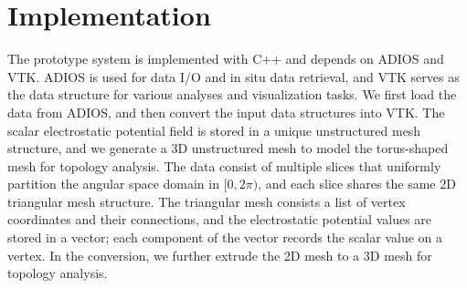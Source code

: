 \section{Implementation}

The prototype system is implemented with C++ and depends on ADIOS and VTK.  ADIOS is used for data I/O and in situ data retrieval, and VTK serves as the data structure for various analyses and visualization tasks.  We first load the data from ADIOS, and then convert the input data structures into VTK.  The scalar electrostatic potential field is stored in a unique unstructured mesh structure, and we generate a 3D unstructured mesh to model the torus-shaped mesh for topology analysis.  The data consist of multiple slices that uniformly partition the angular space domain in $[0, 2\pi)$, and each slice shares the same 2D triangular mesh structure.  The triangular mesh consists a list of vertex coordinates and their connections, and the electrostatic potential values are stored in a vector; each component of the vector records the scalar value on a vertex.  In the conversion, we further extrude the 2D mesh to a 3D mesh for topology analysis.  

